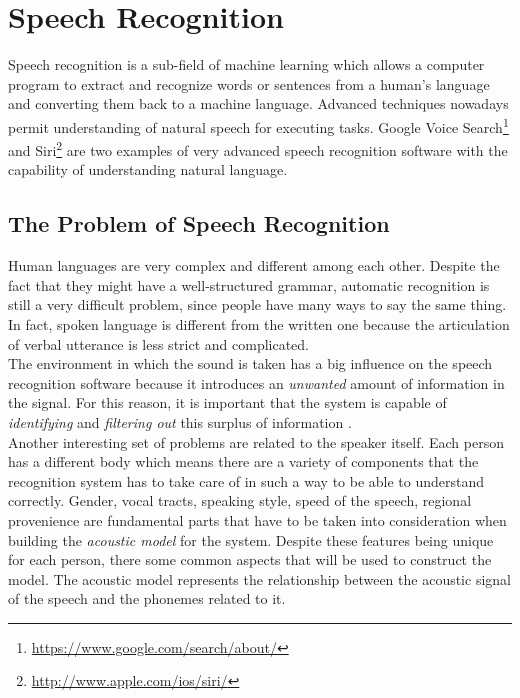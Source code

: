 
\chapter{Speech Recognition}
\label{chap:Speech Recognition}
Speech recognition is a sub-field of machine learning which allows a computer program to extract and recognize words or sentences from a human's language and converting them back to a machine language. Advanced techniques nowadays permit understanding of natural speech for executing tasks. Google Voice Search\footnote{\url{https://www.google.com/search/about/}} and Siri\footnote{\url{http://www.apple.com/ios/siri/}} are two examples of very advanced speech recognition software with the capability of understanding natural language.

\section{The Problem of Speech Recognition}
\label{sec:The Problem of Speech Recognition}
Human languages are very complex and different among each other.  Despite the fact that they might have a well-structured grammar, automatic recognition is still a very difficult problem, since people have many ways to say the same thing. In fact, spoken language is different from the written one because the articulation of verbal utterance is less strict and complicated. \\
The environment in which the sound is taken has a big influence on the speech recognition software because it introduces an \textit{unwanted} amount of information in the signal. For this reason, it is important that the system is capable of \textit{identifying} and \textit{filtering out} this surplus of information \cite{forsberg2003speech}. \\

\noindent Another interesting set of problems are related to the speaker itself. Each person has a different body which means there are a variety of components that the recognition system has to take care of in such a way to be able to understand correctly. Gender, vocal tracts, speaking style, speed of the speech, regional provenience are fundamental parts that have to be taken into consideration when building the \textit{acoustic model} for the system. Despite these features being unique for each person, there some common aspects that will be used to construct the model. The acoustic model represents the relationship between the acoustic signal of the speech and the phonemes related to it. \\

